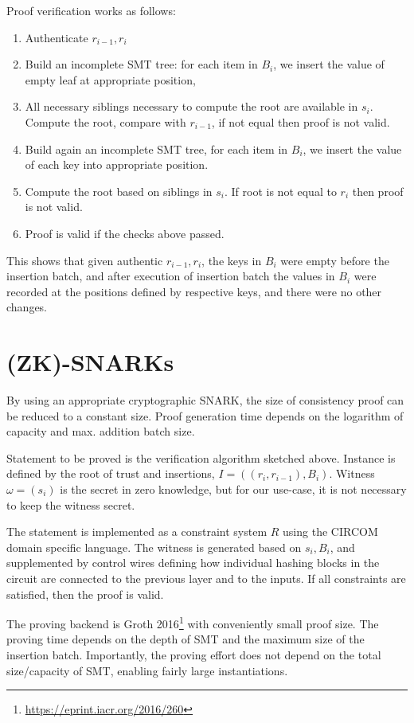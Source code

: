 \documentclass{llncs}
\begin{document}
Proof verification works as follows:

\begin{enumerate}
    \item Authenticate $r_{i-1}, r_i$
    \item Build an incomplete SMT tree: for each item in $B_i$, we insert the value of empty leaf at appropriate position,
    \item All necessary siblings necessary to compute the root are available in $s_i$. Compute the root, compare with $r_{i-1}$, if not equal then proof is not valid.
    \item Build again an incomplete SMT tree, for each item in $B_i$, we insert the value of each key into appropriate position.
    \item Compute the root based on siblings in $s_i$. If root is not equal to $r_i$ then proof is not valid.
    \item Proof is valid if the checks above passed.
\end{enumerate}

This shows that given authentic $r_{i-1}, r_i$, the keys in $B_i$ were empty before the insertion batch, and after execution of insertion batch the values in $B_i$ were recorded at the positions defined by respective keys, and there were no other changes.


\section{(ZK)-SNARKs}

By using an appropriate cryptographic SNARK, the size of consistency proof can be reduced to a constant size. Proof generation time depends on the logarithm of capacity and max. addition batch size.

Statement to be proved is the verification algorithm sketched above. Instance is defined by the root of trust and insertions, $I = ((r_i, r_{i-1}),B_i)$. Witness $\omega = (s_i)$ is the secret in zero knowledge, but for our use-case, it is not necessary to keep the witness secret.

The statement is implemented as a constraint system $R$ using the CIRCOM domain specific language. The witness is generated based on $s_i, B_i$, and supplemented by control wires defining how individual hashing blocks in the circuit are connected to the previous layer and to the inputs. If all constraints are satisfied, then the proof is valid.

The proving backend is Groth 2016\footnote{\url{https://eprint.iacr.org/2016/260}} with conveniently small proof size. The proving time depends on the depth of SMT and the maximum size of the insertion batch. Importantly, the proving effort does not depend on the total size/capacity of SMT, enabling fairly large instantiations.
\end{document}
